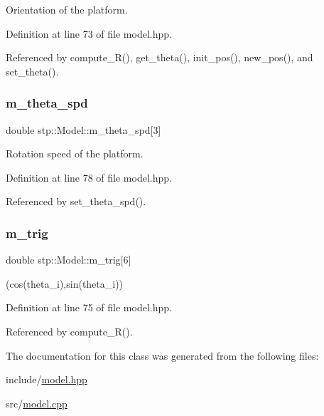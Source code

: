 Orientation of the platform. 

Definition at line 73 of file model.\+hpp.



Referenced by compute\+\_\+\+R(), get\+\_\+theta(), init\+\_\+pos(), new\+\_\+pos(), and set\+\_\+theta().

\mbox{\label{classstp_1_1_model_aa12970f18bc4258b9ad185f54a9cfe70}} 
\subsubsection{\texorpdfstring{m\+\_\+theta\+\_\+spd}{m\_theta\_spd}}
{\footnotesize\ttfamily double stp\+::\+Model\+::m\+\_\+theta\+\_\+spd\mbox{[}3\mbox{]}\hspace{0.3cm}{\ttfamily [protected]}}

Rotation speed of the platform. 

Definition at line 78 of file model.\+hpp.



Referenced by set\+\_\+theta\+\_\+spd().

\mbox{\label{classstp_1_1_model_afdc7491e9be320ad94775ca046667f9b}} 
\subsubsection{\texorpdfstring{m\+\_\+trig}{m\_trig}}
{\footnotesize\ttfamily double stp\+::\+Model\+::m\+\_\+trig\mbox{[}6\mbox{]}\hspace{0.3cm}{\ttfamily [protected]}}

(cos(theta\+\_\+i),sin(theta\+\_\+i)) 

Definition at line 75 of file model.\+hpp.



Referenced by compute\+\_\+\+R().



The documentation for this class was generated from the following files\+:\begin{DoxyCompactItemize}
\item 
include/\hyperlink{model_8hpp}{model.\+hpp}\item 
src/\hyperlink{model_8cpp}{model.\+cpp}\end{DoxyCompactItemize}
